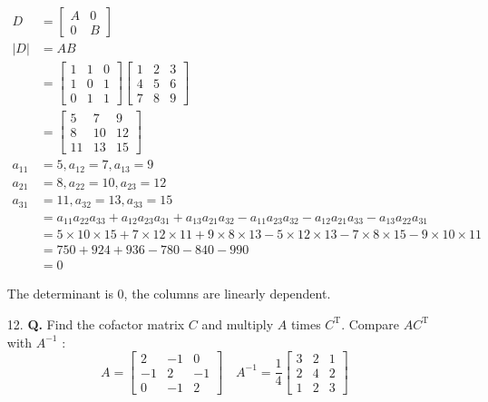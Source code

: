 \documentclass[main.tex]{subfiles}
\begin{document}
\begin{enumerate}
    $$
    \begin{aligned}
    D &=\left[\begin{array}{ll}
    A & 0 \\
    0 & B
    \end{array}\right] \\
    |D| &=A B \\
    &=\left[\begin{array}{lll}
    1 & 1 & 0 \\
    1 & 0 & 1 \\
    0 & 1 & 1
    \end{array}\right]\left[\begin{array}{lll}
    1 & 2 & 3 \\
    4 & 5 & 6 \\
    7 & 8 & 9
    \end{array}\right] \\
    &=\left[\begin{array}{ccc}
    5 & 7 & 9 \\
    8 & 10 & 12 \\
    11 & 13 & 15
    \end{array}\right]\\
    a_{11}&=5, a_{12}=7, a_{13}=9 \\
    a_{21}&=8, a_{22}=10, a_{23}=12 \\
    a_{31}&=11, a_{32}=13, a_{33}=15 \\
    &=a_{11} a_{22} a_{33}+a_{12} a_{23} a_{31}+a_{13} a_{21} a_{32}-a_{11} a_{23} a_{32}-a_{12} a_{21} a_{33}-a_{13} a_{22} a_{31} \\
    &=5 \times 10 \times 15+7 \times 12 \times 11+9 \times 8 \times 13-5 \times 12 \times 13-7 \times 8 \times 15-9 \times 10 \times 11 \\
    &=750+924+936-780-840-990 \\
    & = 0
    \end{aligned}
    $$
    
    The determinant is 0, the columns are linearly dependent.
    
    \item [12.] \textbf{Q.} Find the cofactor matrix $C$ and multiply $A$ times $C^{\mathrm{T}}$. Compare $A C^{\mathrm{T}}$ with $A^{-1}$ :
    $$
    A=\left[\begin{array}{rrr}
    2 & -1 & 0 \\
    -1 & 2 & -1 \\
    0 & -1 & 2
    \end{array}\right] \quad A^{-1}=\frac{1}{4}\left[\begin{array}{lll}
    3 & 2 & 1 \\
    2 & 4 & 2 \\
    1 & 2 & 3
    \end{array}\right]
    $$
    

\end{enumerate}
\end{document}
